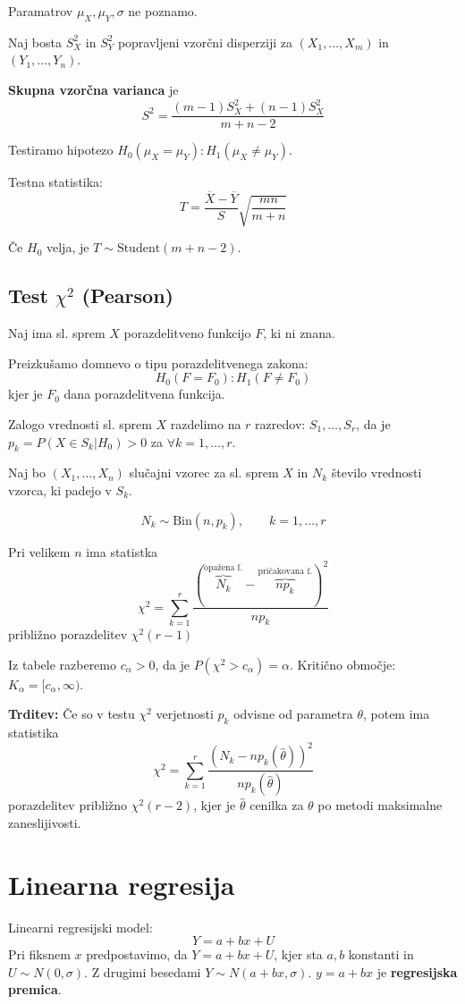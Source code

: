 \begin{multicols}{5}
Paramatrov $\mu_X, \mu_Y, \sigma$ ne poznamo.

Naj bosta $S_X^2$ in $S_Y^2$ popravljeni vzorčni disperziji za $(X_1, \dots, X_m)$ in $(Y_1, \dots, Y_n)$.

\textbf{Skupna vzorčna varianca} je
\[ S^2 = \frac{(m-1)S_X^2 + (n-1)S_X^2}{m+n-2}\]

Testiramo hipotezo $H_0(\mu_X = \mu_Y) : H_1(\mu_X \neq \mu_Y)$.

Testna statistika:
\[ T = \frac{\overline{X} - \overline{Y}}{S}\sqrt{\frac{mn}{m+n}}\]

Če $H_0$ velja, je $T \sim \text{Student}(m+n-2)$.

\subsection{Test $\chi^2$ (Pearson)}
Naj ima sl. sprem $X$ porazdelitveno funkcijo $F$, ki ni znana.

Preizkušamo domnevo o tipu porazdelitvenega zakona:
\[ H_0(F = F_0) : H_1(F \neq F_0)\]
kjer je $F_0$ dana porazdelitvena funkcija.

Zalogo vrednosti sl. sprem $X$ razdelimo na $r$ razredov: $S_1, \dots, S_r$, da je $p_k = P(X \in S_k | H_0) > 0$ za $\forall k = 1, \dots, r$.

Naj bo $(X_1, \dots, X_n)$ slučajni vzorec za sl. sprem $X$ in $N_k$ število vrednosti vzorca, ki padejo v $S_k$. 

\[ N_k \sim \text{Bin}(n, p_k), \qquad k = 1, \dots, r\]

Pri velikem $n$ ima statistka
\[\chi^2 = \sum_{k=1}^r \frac{(\overbrace{N_k}^{\text{opažena f.}} - \overbrace{np_k}^{\text{pričakovana f.}})^2}{np_k}\]
približno porazdelitev $\chi^2(r-1)$

Iz tabele razberemo $c_{\alpha} > 0$, da je $P(\chi^2 > c_{\alpha}) = \alpha$. Kritično območje: $K_{\alpha} = [c_{\alpha}, \infty)$.

\textbf{Trditev:} Če so v testu $\chi^2$ verjetnosti $p_k$ odvisne od parametra $\theta$, potem ima statistika
\[ \chi^2 = \sum_{k=1}^r \frac{({N_k} - {np_k(\hat{\theta})})^2}{np_k(\hat{\theta})}\]
porazdelitev približno $\chi^2(r-2)$, kjer je $\hat{\theta}$ cenilka za $\theta$ po metodi maksimalne zaneslijivosti.

\section{Linearna regresija }

Linearni regresijski model:
\[ Y = a + bx + U\]
Pri fiksnem $x$ predpostavimo, da $Y = a + bx + U$, kjer sta $a, b$ konstanti in $U \sim N(0, \sigma)$. 
Z drugimi besedami $Y \sim N(a+bx, \sigma)$. $y = a+bx$ je \textbf{regresijska premica}.


\end{multicols}
